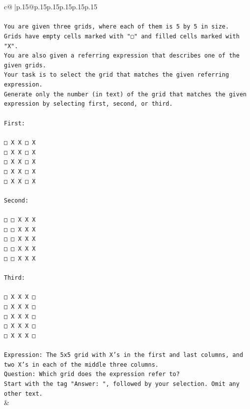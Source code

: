 \documentclass{article}
\begin{document}
{\begin{supertabular}{c@{$\;$}|p{.15\linewidth}@{}p{.15\linewidth}p{.15\linewidth}p{.15\linewidth}p{.15\linewidth}p{.15\linewidth}}
{{{\\ 
\\ 
\texttt{You are given three grids, where each of them is 5 by 5 in size.} \\
\texttt{Grids have empty cells marked with "▢" and filled cells marked with "X".} \\
\texttt{You are also given a referring expression that describes one of the given grids.} \\
\texttt{Your task is to select the grid that matches the given referring expression.} \\
\texttt{Generate only the number (in text) of the grid that matches the given expression by selecting first, second, or third.} \\
\\ 
\texttt{First:} \\
\\ 
\texttt{□ X X □ X} \\
\texttt{□ X X □ X} \\
\texttt{□ X X □ X} \\
\texttt{□ X X □ X} \\
\texttt{□ X X □ X} \\
\\ 
\texttt{Second:} \\
\\ 
\texttt{□ □ X X X} \\
\texttt{□ □ X X X} \\
\texttt{□ □ X X X} \\
\texttt{□ □ X X X} \\
\texttt{□ □ X X X} \\
\\ 
\texttt{Third:} \\
\\ 
\texttt{□ X X X □} \\
\texttt{□ X X X □} \\
\texttt{□ X X X □} \\
\texttt{□ X X X □} \\
\texttt{□ X X X □} \\
\\ 
\texttt{Expression: The 5x5 grid with X's in the first and last columns, and two X's in each of the middle three columns.} \\
\texttt{Question: Which grid does the expression refer to?} \\
\texttt{Start with the tag "Answer: ", followed by your selection. Omit any other text.} \\
            }
        }
    }
    & \\ \\


\end{supertabular}}
\end{document}

